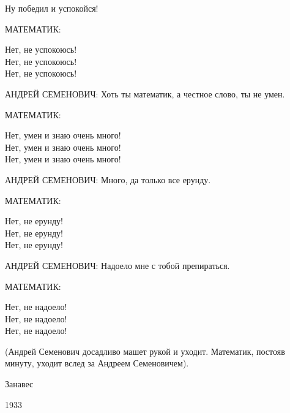 	\hspace{1cm}
	\parbox{10cm}{Ну победил и успокойся!}

МАТЕМАТИК: 

	\hspace{1cm}
	\parbox{10cm}{Нет, не успокоюсь! \\
	Нет, не успокоюсь! \\
	Нет, не успокоюсь!}

АНДРЕЙ СЕМЕНОВИЧ:  Хоть ты математик, а 
честное слово, ты не умен. 

МАТЕМАТИК: 

	\hspace{1cm}
    \parbox{10cm}{Нет, умен и знаю очень много! \\
    Нет, умен и знаю очень много! \\
    Нет, умен и знаю очень много!}

АНДРЕЙ СЕМЕНОВИЧ:  Много,  да только все 
ерунду. 

МАТЕМАТИК:

	\hspace{1cm}
	\parbox{10cm}{Нет, не ерунду! \\
	Нет, не ерунду! \\
	Нет, не ерунду!}

АНДРЕЙ СЕМЕНОВИЧ: Надоело мне с тобой 
препираться. 

МАТЕМАТИК: 

	\hspace{1cm}
	\parbox{10cm}{Нет, не надоело! \\
	Нет, не надоело! \\
	Нет, не надоело!}

(Андрей Семенович досадливо машет  рукой
и уходит.  Математик, постояв минуту, уходит
вслед за Андреем Семеновичем).

\begin{center}
	Занавес
\end{center}
\begin{flushright}
	1933
\end{flushright}